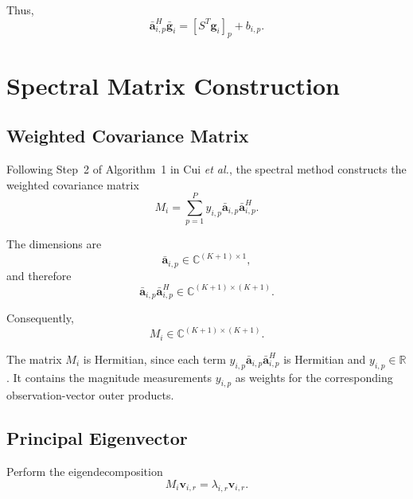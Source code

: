 \documentclass[12pt,a4paper]{article}
\begin{document}
Thus,
\begin{equation}
\boxed{
\bar{\mathbf a}_{i,p}^H\bar{\mathbf g}_i
=
\left[S^T\mathbf g_i\right]_p
+
b_{i,p}
}.
\tag{248}
\end{equation}

\section{Spectral Matrix Construction}

\subsection{Weighted Covariance Matrix}

Following Step~2 of Algorithm~1 in Cui \emph{et al.}, the spectral
method constructs the weighted covariance matrix
\begin{equation}
\boxed{
M_i
=
\sum_{p=1}^{P}
y_{i,p}
\bar{\mathbf a}_{i,p}
\bar{\mathbf a}_{i,p}^H
}.
\tag{249}
\end{equation}

The dimensions are
\begin{equation}
\bar{\mathbf a}_{i,p}
\in
\mathbb{C}^{(K+1)\times1},
\tag{250}
\end{equation}
and therefore
\begin{equation}
\bar{\mathbf a}_{i,p}
\bar{\mathbf a}_{i,p}^H
\in
\mathbb{C}^{(K+1)\times(K+1)}.
\tag{251}
\end{equation}

Consequently,
\begin{equation}
\boxed{
M_i
\in
\mathbb{C}^{(K+1)\times(K+1)}
}.
\tag{252}
\end{equation}

The matrix $M_i$ is Hermitian, since each term
$y_{i,p}\bar{\mathbf a}_{i,p}\bar{\mathbf a}_{i,p}^H$ is Hermitian and
$y_{i,p}\in\mathbb R$. It contains the magnitude measurements
$y_{i,p}$ as weights for the corresponding observation-vector outer
products.

\subsection{Principal Eigenvector}

Perform the eigendecomposition
\begin{equation}
\boxed{
M_i\mathbf v_{i,r}
=
\lambda_{i,r}\mathbf v_{i,r}
}.
\tag{253}
\end{equation}
\end{document}
